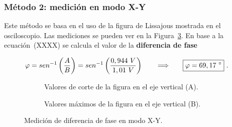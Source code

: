     \subsubsection*{Método 2: medición en modo X-Y}
    Este método se basa en el uso de la figura de Lissajous mostrada en el osciloscopio. Las mediciones se pueden ver en la 
    Figura~\ref{fig:DesfaseConLissajous}. En base a la ecuación~(XXXX) se calcula el valor de la \textbf{diferencia de fase}
    
    \begin{align*}
      \varphi = sen ^{-1} \left( \dfrac{A}{B} \right) = sen ^{-1} \left( \dfrac{0,944\ V}{1,01\ V} \right) \hspace{20pt} \Longrightarrow \hspace{20pt} \Aboxed{\varphi = 69,17\ ^{\circ}}\ .
    \end{align*}

    \begin{figure}[H]
      \centering
      \begin{subfigure}[h]{0.4\textwidth}
        \centering
        \caption{Valores de corte de la figura en el eje vertical (A).}
        \label{fig:CortesEjeVertical_Lissajous}
      \end{subfigure}
      \hspace{20pt} 
      \begin{subfigure}[h]{0.4\textwidth}
        \centering
        \caption{Valores máximos de la figura en el eje vertical (B).}
        \label{fig:MaximosEjeVertical_Lissajous}
      \end{subfigure}
      \caption{Medición de diferencia de fase en  modo X-Y.}
      \label{fig:DesfaseConLissajous}
    \end{figure}


